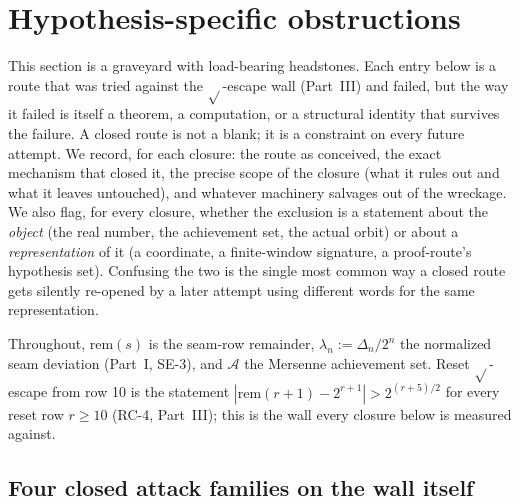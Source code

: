 \section{Hypothesis-specific obstructions}

This section is a graveyard with load-bearing headstones. Each entry below is a route that was
tried against the $\sqrt{}$-escape wall (Part~III) and failed, but the way it failed is itself a
theorem, a computation, or a structural identity that survives the failure. A closed route is not
a blank; it is a constraint on every future attempt. We record, for each closure: the route as
conceived, the exact mechanism that closed it, the precise scope of the closure (what it rules
out and what it leaves untouched), and whatever machinery salvages out of the wreckage. We also
flag, for every closure, whether the exclusion is a statement about the \emph{object} (the real
number, the achievement set, the actual orbit) or about a \emph{representation} of it (a
coordinate, a finite-window signature, a proof-route's hypothesis set). Confusing the two is the
single most common way a closed route gets silently re-opened by a later attempt using different
words for the same representation.

Throughout, $\mathrm{rem}(s)$ is the seam-row remainder, $\lambda_n := \Delta_n/2^n$ the normalized seam
deviation (Part~I, SE-3), and $\mathcal A$ the Mersenne achievement set. Reset $\sqrt{}$-escape
from row 10 is the statement $|\mathrm{rem}(r+1)-2^{r+1}| > 2^{(r+5)/2}$ for every reset row $r\ge 10$
(RC-4, Part~III); this is the wall every closure below is measured against.

\subsection{Four closed attack families on the wall itself}

